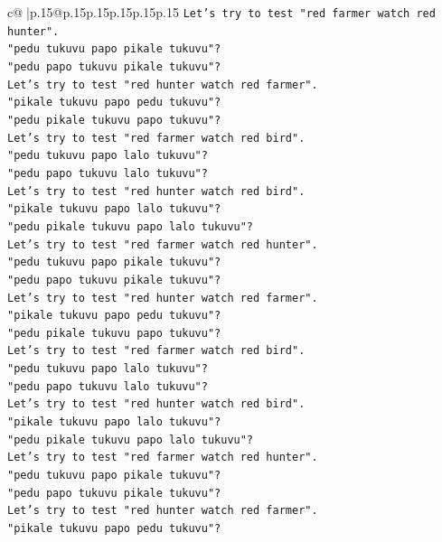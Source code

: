 \documentclass{article}
\begin{document}
{\begin{supertabular}{c@{$\;$}|p{.15\linewidth}@{}p{.15\linewidth}p{.15\linewidth}p{.15\linewidth}p{.15\linewidth}p{.15\linewidth}}
{{{\texttt{Let's try to test "red farmer watch red hunter".} \\
\texttt{"pedu tukuvu papo pikale tukuvu"?} \\
\texttt{"pedu papo tukuvu pikale tukuvu"?} \\
\texttt{Let's try to test "red hunter watch red farmer".} \\
\texttt{"pikale tukuvu papo pedu tukuvu"?} \\
\texttt{"pedu pikale tukuvu papo tukuvu"?} \\
\texttt{Let's try to test "red farmer watch red bird".} \\
\texttt{"pedu tukuvu papo lalo tukuvu"?} \\
\texttt{"pedu papo tukuvu lalo tukuvu"?} \\
\texttt{Let's try to test "red hunter watch red bird".} \\
\texttt{"pikale tukuvu papo lalo tukuvu"?} \\
\texttt{"pedu pikale tukuvu papo lalo tukuvu"?} \\
\texttt{Let's try to test "red farmer watch red hunter".} \\
\texttt{"pedu tukuvu papo pikale tukuvu"?} \\
\texttt{"pedu papo tukuvu pikale tukuvu"?} \\
\texttt{Let's try to test "red hunter watch red farmer".} \\
\texttt{"pikale tukuvu papo pedu tukuvu"?} \\
\texttt{"pedu pikale tukuvu papo tukuvu"?} \\
\texttt{Let's try to test "red farmer watch red bird".} \\
\texttt{"pedu tukuvu papo lalo tukuvu"?} \\
\texttt{"pedu papo tukuvu lalo tukuvu"?} \\
\texttt{Let's try to test "red hunter watch red bird".} \\
\texttt{"pikale tukuvu papo lalo tukuvu"?} \\
\texttt{"pedu pikale tukuvu papo lalo tukuvu"?} \\
\texttt{Let's try to test "red farmer watch red hunter".} \\
\texttt{"pedu tukuvu papo pikale tukuvu"?} \\
\texttt{"pedu papo tukuvu pikale tukuvu"?} \\
\texttt{Let's try to test "red hunter watch red farmer".} \\
\texttt{"pikale tukuvu papo pedu tukuvu"?} \\
}}}
\end{supertabular}}
\end{document}
